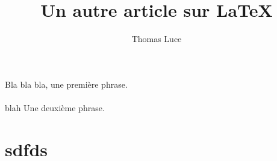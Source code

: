 \documentclass[11pt,a4paper]{article}
\title{Un autre article sur \LaTeX}
\author{Thomas Luce}
\date{}
\begin{document}
\maketitle


Bla bla bla, une première phrase.
\\
\\
blah
Une deuxième phrase.
\chapter{sdfds}
\end{document}
